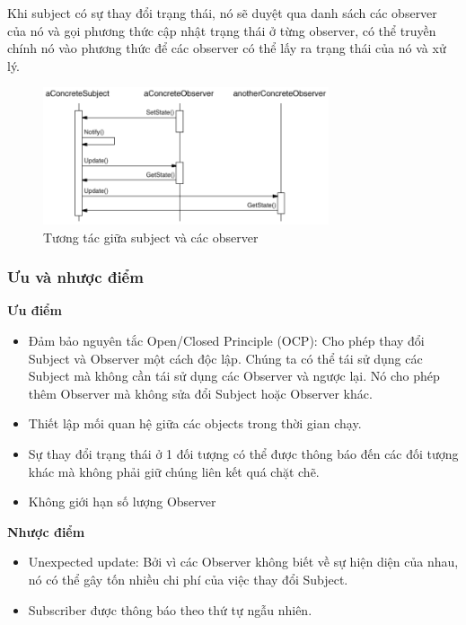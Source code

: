 \hspace*{0.5cm}Khi subject có sự thay đổi trạng thái, nó sẽ duyệt qua danh sách các observer của nó và gọi phương thức cập nhật trạng thái ở từng observer, có thể truyền chính nó vào phương thức để các observer có thể lấy ra trạng thái của nó và xử lý.
\begin{figure}[H]
	\centering
	\includegraphics[width=0.75\textwidth]{Images/observer_work.png}
	\vspace{0.5cm}
	\caption{Tương tác giữa subject và các observer}
\end{figure}
\subsubsection{Ưu và nhược điểm}
\hspace*{.5cm} \textbf{Ưu điểm}
\begin{itemize}
	\item Đảm bảo nguyên tắc Open/Closed Principle (OCP): Cho phép thay đổi Subject và Observer một cách độc lập. Chúng ta có thể tái sử dụng các Subject mà không cần tái sử dụng các Observer và ngược lại. Nó cho phép thêm Observer mà không sửa đổi Subject hoặc Observer khác.
	\item Thiết lập mối quan hệ giữa các objects trong thời gian chạy.
	\item Sự thay đổi trạng thái ở 1 đối tượng có thể được thông báo đến các đối tượng khác mà không phải giữ chúng liên kết quá chặt chẽ.
	\item Không giới hạn số lượng Observer
\end{itemize}
\hspace*{.5cm} \textbf{Nhược điểm}
\begin{itemize}
	\item Unexpected update: Bởi vì các Observer không biết về sự hiện diện của nhau, nó có thể gây tốn nhiều chi phí của việc thay đổi Subject.
	\item Subscriber được thông báo theo thứ tự ngẫu nhiên.
\end{itemize}
